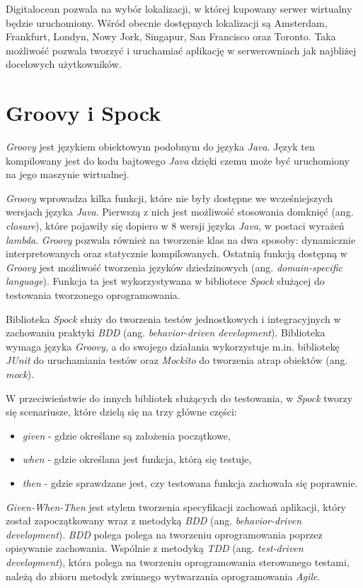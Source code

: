 Digitalocean pozwala na wybór lokalizacji, w której kupowany serwer wirtualny będzie uruchomiony. Wśród obecnie dostępnych lokalizacji są Amsterdam, Frankfurt, Londyn, Nowy Jork, Singapur, San Francisco oraz Toronto. Taka możliwość pozwala tworzyć i uruchamiać aplikację w serwerowniach jak najbliżej docelowych użytkowników. 

\section{Groovy i Spock} 
\label{groovy_and_spock}

\textsl{Groovy} jest językiem obiektowym podobnym do języka \textsl{Java}. Język ten kompilowany jest do kodu bajtowego \textsl{Java} dzięki czemu może być uruchomiony na jego maszynie wirtualnej. 

\textsl{Groovy} wprowadza kilka funkcji, które nie były dostępne we wcześniejszych wersjach języka \textsl{Java}. Pierwszą z nich jest możliwość stosowania domknięć (ang. \textsl{closure}), które pojawiły się dopiero w 8 wersji języka \textsl{Java}, w postaci wyrażeń \textsl{lambda}. \textsl{Groovy} pozwala również na tworzenie klas na dwa sposoby: dynamicznie interpretowanych oraz statycznie kompilowanych. Ostatnią funkcją dostępną w \textsl{Groovy} jest możliwość tworzenia języków dziedzinowych (ang. \textsl{domain-specific language}). Funkcja ta jest wykorzystywana w bibliotece \textsl{Spock} służącej do testowania tworzonego oprogramowania.

Biblioteka \textsl{Spock} służy do tworzenia testów jednostkowych i integracyjnych w zachowaniu praktyki \textsl{BDD} (ang. \textsl{behavior-driven development}). Biblioteka wymaga języka \textsl{Groovy}, a do swojego działania wykorzystuje m.in. bibliotekę \textsl{JUnit} do uruchamiania testów oraz \textsl{Mockito} do tworzenia atrap obiektów (ang. \textsl{mock}). 

W przeciwieństwie do innych bibliotek służących do testowania, w \textsl{Spock} tworzy się scenariusze, które dzielą się na trzy główne części: 
\begin{itemize}
    \item \textsl{given} - gdzie określane są założenia początkowe,
    \item \textsl{when} - gdzie określana jest funkcja, którą się testuje,
    \item \textsl{then} - gdzie sprawdzane jest, czy testowana funkcja zachowała się poprawnie.
\end{itemize}
\textsl{Given-When-Then} jest stylem tworzenia specyfikacji zachowań aplikacji, który został zapoczątkowany wraz z metodyką \textsl{BDD} (ang. \textsl{behavior-driven development}). \textsl{BDD} polega polega na tworzeniu oprogramowania poprzez opisywanie zachowania. Wspólnie z metodyką \textsl{TDD} (ang. \textsl{test-driven development}), która polega na tworzeniu oprogramowania sterowanego testami, należą do zbioru metodyk zwinnego wytwarzania oprogramowania \textsl{Agile}.